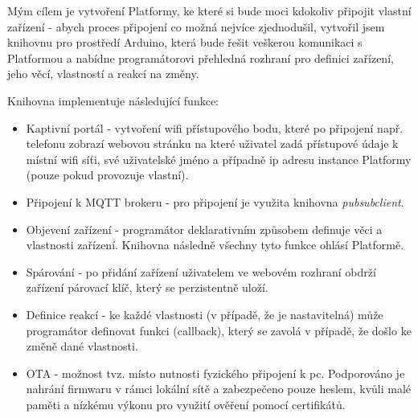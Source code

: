 Mým cílem je vytvoření Platformy, ke které si bude moci kdokoliv připojit vlastní zařízení - abych proces připojení co možná nejvíce zjednodušil, vytvořil jsem knihovnu pro prostředí Arduino, která bude řešit veškerou komunikaci s Platformou a nabídne programátorovi přehledná rozhraní pro definici zařízení, jeho věcí, vlastností a reakcí na změny.

Knihovna implementuje následující funkce:
\begin{itemize}
    \item Kaptivní portál - vytvoření wifi přístupového bodu, které po připojení např. telefonu zobrazí webovou stránku na které uživatel zadá přístupové údaje k místní wifi síťi, své uživatelské jméno a případně ip adresu instance Platformy (pouze pokud provozuje vlastní).
    \item Připojení k MQTT brokeru - pro připojení je využita knihovna \textit{pubsubclient}.
    \item Objevení zařízení - programátor deklarativním způsobem definuje věci a vlastnosti zařízení. Knihovna následně všechny tyto funkce ohlásí Platformě.
    \item Spárování - po přidání zařízení uživatelem ve webovém rozhraní obdrží zařízení párovací klíč, který se perzistentně uloží.
    \item Definice reakcí - ke každé vlastnosti (v případě, že je nastavitelná) může programátor definovat funkci (callback), který se zavolá v případě, že došlo ke změně dané vlastnosti.
    \item OTA - možnost tvz.  místo nutnosti fyzického připojení k pc. Podporováno je nahrání firmwaru v rámci lokální sítě a zabezpečeno pouze heslem, kvůli malé paměti a nízkému výkonu pro využití ověření pomocí certifikátů.
\end{itemize}